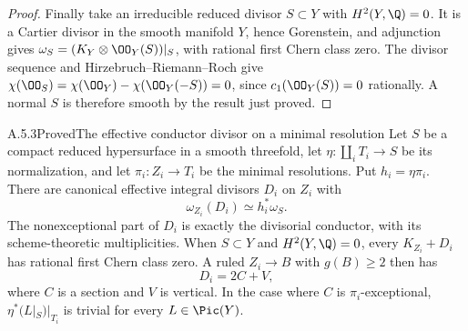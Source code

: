 \begin{proof}
Finally take an irreducible reduced divisor $S\subset Y$ with $H^2(Y,\Q)=0$. It is a Cartier divisor in the smooth manifold $Y$, hence Gorenstein, and adjunction gives $\omega_S=(K_Y\otimes\OO_Y(S))|_S$, with rational first Chern class zero. The divisor sequence and Hirzebruch--Riemann--Roch give
$\chi(\OO_S)=\chi(\OO_Y)-\chi(\OO_Y(-S))=0$, since $c_1(\OO_Y(S))=0$ rationally. A normal $S$ is therefore smooth by the result just proved.
\end{proof}

\begin{statement}{A.5.3}{Proved}{The effective conductor divisor on a minimal resolution}
Let $S$ be a compact reduced hypersurface in a smooth threefold, let $\eta:\coprod_i T_i\to S$ be its normalization, and let $\pi_i:Z_i\to T_i$ be the minimal resolutions. Put $h_i=\eta\pi_i$. There are canonical effective integral divisors $D_i$ on $Z_i$ with
\[
 \omega_{Z_i}(D_i)\simeq h_i^*\omega_S.
 \tag{A.25}
\]
The nonexceptional part of $D_i$ is exactly the divisorial conductor, with its scheme-theoretic multiplicities. When $S\subset Y$ and $H^2(Y,\Q)=0$, every $K_{Z_i}+D_i$ has rational first Chern class zero. A ruled $Z_i\to B$ with $g(B)\ge2$ then has
\[
 D_i=2C+V,
 \tag{A.26}
\]
where $C$ is a section and $V$ is vertical. In the case where $C$ is $\pi_i$-exceptional, $\eta^*(L|_S)|_{T_i}$ is trivial for every $L\in\Pic(Y)$.
\end{statement}
